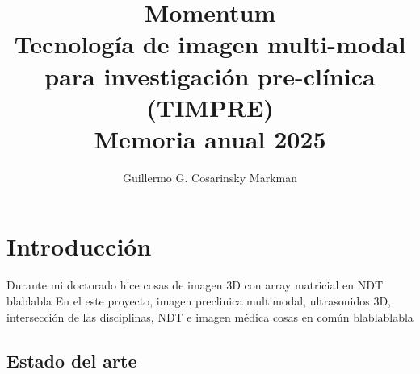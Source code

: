 \documentclass[10pt,a4paper]{report}
\title{Momentum \\ Tecnología de imagen multi-modal para investigación pre-clínica (TIMPRE) \\ Memoria anual 2025}
\author{Guillermo G. Cosarinsky Markman}
\date{}
\begin{document}
	
\maketitle

\chapter{Introducción}
Durante mi doctorado hice cosas de imagen 3D con array matricial en NDT blablabla
En el este proyecto, imagen preclinica multimodal, ultrasonidos 3D, intersección de las disciplinas, NDT e imagen médica cosas en común blablablabla

\section{Estado del arte}
\end{document}
